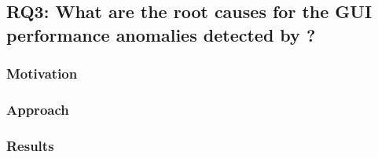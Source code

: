 \subsection{RQ3: What are the root causes for the  GUI performance anomalies detected by \tool?}

\subsubsection{Motivation} 


\subsubsection{Approach}


\subsubsection{Results}

